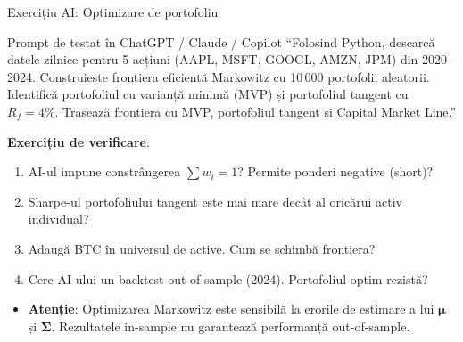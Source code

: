\documentclass[9pt, aspectratio=169, t]{beamer}
\theoremstyle{definition}
\newenvironment{cminipage}[1]{%
    \par\noindent\hfill\begin{minipage}{#1}\ignorespaces
}{%
    \end{minipage}\hfill\null\par
}
\begin{document}
\begin{frame}[shrink=3]{Exercițiu AI: Optimizare de portofoliu}
    \begin{cminipage}{0.95\textwidth}
    \begin{block}{\footnotesize Prompt de testat în ChatGPT / Claude / Copilot}
        {\small
        ``Folosind Python, descarcă datele zilnice pentru 5 acțiuni (AAPL, MSFT, GOOGL, AMZN, JPM) din 2020--2024.
        Construiește frontiera eficientă Markowitz cu 10\,000 portofolii aleatorii.
        Identifică portofoliul cu varianță minimă (MVP) și portofoliul tangent cu $R_f = 4\%$.
        Trasează frontiera cu MVP, portofoliul tangent și Capital Market Line.''
        }
    \end{block}
    \vspace{-1mm}
    {\small
    \textbf{Exercițiu de verificare}:
    \begin{enumerate}
        \item AI-ul impune constrângerea $\sum w_i = 1$? Permite ponderi negative (short)?
        \item Sharpe-ul portofoliului tangent este mai mare decât al oricărui activ individual?
        \item Adaugă BTC în universul de active. Cum se schimbă frontiera?
        \item Cere AI-ului un backtest out-of-sample (2024). Portofoliul optim rezistă?
    \end{enumerate}
    }
    \vspace{-1mm}
    \begin{alertblock}{}
        {\small
        \begin{itemize}\setlength{\itemsep}{0pt}
            \item \textbf{Atenție}: Optimizarea Markowitz este sensibilă la erorile de estimare a lui $\boldsymbol{\mu}$ și $\boldsymbol{\Sigma}$. Rezultatele in-sample nu garantează performanță out-of-sample.
        \end{itemize}
        }
    \end{alertblock}
    \end{cminipage}
\end{frame}
\end{document}
